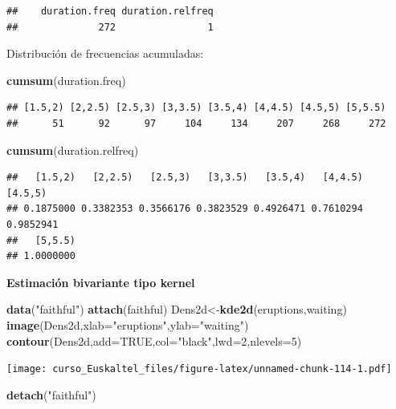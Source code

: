 \documentclass[]{book}
\newenvironment{Shaded}{\begin{snugshade}}{\end{snugshade}}
\newcommand{\KeywordTok}[1]{\textcolor[rgb]{0.13,0.29,0.53}{\textbf{#1}}}
\newcommand{\DataTypeTok}[1]{\textcolor[rgb]{0.13,0.29,0.53}{#1}}
\newcommand{\DecValTok}[1]{\textcolor[rgb]{0.00,0.00,0.81}{#1}}
\newcommand{\StringTok}[1]{\textcolor[rgb]{0.31,0.60,0.02}{#1}}
\newcommand{\OtherTok}[1]{\textcolor[rgb]{0.56,0.35,0.01}{#1}}
\newcommand{\NormalTok}[1]{#1}
\begin{document}
\begin{verbatim}
##    duration.freq duration.relfreq 
##              272                1
\end{verbatim}

Distribución de frecuencias acumuladas:

\begin{Shaded}
\begin{Highlighting}[]
\KeywordTok{cumsum}\NormalTok{(duration.freq)}
\end{Highlighting}
\end{Shaded}

\begin{verbatim}
## [1.5,2) [2,2.5) [2.5,3) [3,3.5) [3.5,4) [4,4.5) [4.5,5) [5,5.5) 
##      51      92      97     104     134     207     268     272
\end{verbatim}

\begin{Shaded}
\begin{Highlighting}[]
\KeywordTok{cumsum}\NormalTok{(duration.relfreq)}
\end{Highlighting}
\end{Shaded}

\begin{verbatim}
##   [1.5,2)   [2,2.5)   [2.5,3)   [3,3.5)   [3.5,4)   [4,4.5)   [4.5,5) 
## 0.1875000 0.3382353 0.3566176 0.3823529 0.4926471 0.7610294 0.9852941 
##   [5,5.5) 
## 1.0000000
\end{verbatim}

\textbf{Estimación bivariante tipo kernel}

\begin{Shaded}
\begin{Highlighting}[]
\KeywordTok{data}\NormalTok{(}\StringTok{"faithful"}\NormalTok{)}
\KeywordTok{attach}\NormalTok{(faithful)}
\NormalTok{Dens2d<-}\KeywordTok{kde2d}\NormalTok{(eruptions,waiting)}
\KeywordTok{image}\NormalTok{(Dens2d,}\DataTypeTok{xlab=}\StringTok{"eruptions"}\NormalTok{,}\DataTypeTok{ylab=}\StringTok{"waiting"}\NormalTok{)}
\KeywordTok{contour}\NormalTok{(Dens2d,}\DataTypeTok{add=}\OtherTok{TRUE}\NormalTok{,}\DataTypeTok{col=}\StringTok{"black"}\NormalTok{,}\DataTypeTok{lwd=}\DecValTok{2}\NormalTok{,}\DataTypeTok{nlevels=}\DecValTok{5}\NormalTok{)}
\end{Highlighting}
\end{Shaded}

\texttt{[image: curso\_Euskaltel\_files/figure-latex/unnamed-chunk-114-1.pdf]}

\begin{Shaded}
\begin{Highlighting}[]
\KeywordTok{detach}\NormalTok{(}\StringTok{"faithful"}\NormalTok{)}
\end{Highlighting}
\end{Shaded}
\end{document}
